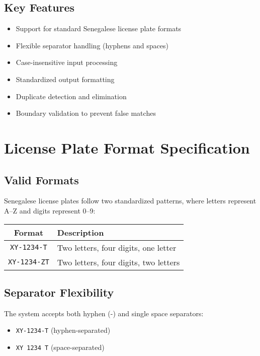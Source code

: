 \documentclass[12pt,a4paper]{article}
\begin{document}
\subsection{Key Features}
\begin{itemize}
    \item Support for standard Senegalese license plate formats
    \item Flexible separator handling (hyphens and spaces)
    \item Case-insensitive input processing
    \item Standardized output formatting
    \item Duplicate detection and elimination
    \item Boundary validation to prevent false matches
\end{itemize}
\newpage
\section{License Plate Format Specification}
\subsection{Valid Formats}
Senegalese license plates follow two standardized patterns, where letters represent A–Z and digits represent 0–9:

\begin{center}
\begin{tabular}{|c|l|}
\hline
\textbf{Format} & \textbf{Description} \\
\hline
\texttt{XY-1234-T} & Two letters, four digits, one letter \\
\texttt{XY-1234-ZT} & Two letters, four digits, two letters \\
\hline
\end{tabular}
\end{center}

\subsection{Separator Flexibility}
The system accepts both hyphen (-) and single space separators:
\begin{itemize}
    \item \texttt{XY-1234-T} (hyphen-separated)
    \item \texttt{XY 1234 T} (space-separated)
\end{itemize}
\end{document}
